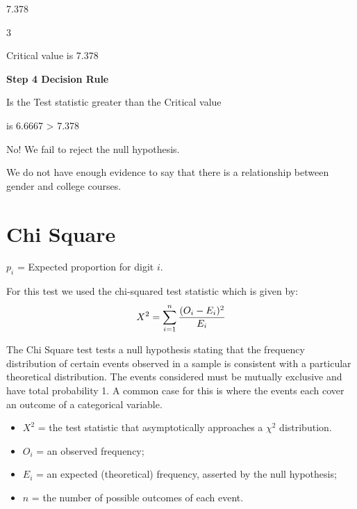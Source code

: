 \documentclass[00-IntroStatsMaster.tex]{subfiles}
\begin{document}
7.378


3
















Critical value is 7.378

\textbf{Step 4 Decision Rule}

Is the Test statistic greater than the Critical value

is 6.6667 > 7.378

No! We fail to reject the null hypothesis.

We do not have enough evidence to say that there is a relationship between gender and college courses.










\section{Chi Square}


$p_{i}$ = Expected proportion for digit $i$.

For this test we used the chi-squared test statistic which is given by:
\begin{equation}
X^2 = \sum_{i=1}^{n} {(O_i - E_i)^2 \over E_i}
\end{equation}


The Chi Square test tests a null hypothesis stating that the frequency distribution of certain events observed in a sample is consistent with a particular theoretical distribution. The events considered must be mutually exclusive and have total probability 1. A common case for this is where the events each cover an outcome of a categorical variable.

\begin{itemize}
	\item $X^2$ = the test statistic that asymptotically approaches a $\chi^2$ distribution.
	\item $O_i$ = an observed frequency;
	\item $E_i$ = an expected (theoretical) frequency, asserted by the null hypothesis;
	\item $n $  = the number of possible outcomes of each event.
\end{itemize}
\end{document}
